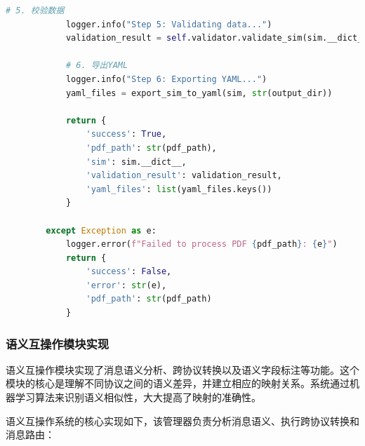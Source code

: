 \begin{lstlisting}[language=Python, label=fig:pdf_processor]
            # 5. 校验数据
            logger.info("Step 5: Validating data...")
            validation_result = self.validator.validate_sim(sim.__dict__)
            
            # 6. 导出YAML
            logger.info("Step 6: Exporting YAML...")
            yaml_files = export_sim_to_yaml(sim, str(output_dir))
            
            return {
                'success': True,
                'pdf_path': str(pdf_path),
                'sim': sim.__dict__,
                'validation_result': validation_result,
                'yaml_files': list(yaml_files.keys())
            }
            
        except Exception as e:
            logger.error(f"Failed to process PDF {pdf_path}: {e}")
            return {
                'success': False,
                'error': str(e),
                'pdf_path': str(pdf_path)
            }
\end{lstlisting}

\subsubsection{语义互操作模块实现}

语义互操作模块实现了消息语义分析、跨协议转换以及语义字段标注等功能。这个模块的核心是理解不同协议之间的语义差异，并建立相应的映射关系。系统通过机器学习算法来识别语义相似性，大大提高了映射的准确性。

语义互操作系统的核心实现如下，该管理器负责分析消息语义、执行跨协议转换和消息路由：

